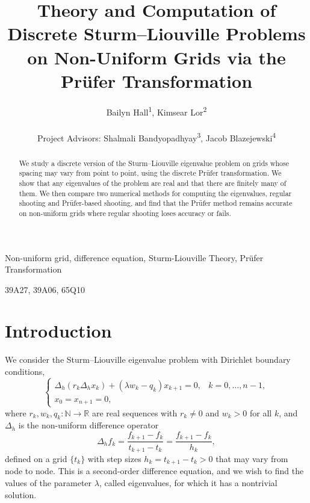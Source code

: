 \documentclass[12pt,reqno]{amsart}
\title[Non-Uniform Discrete Pr\"ufer]{Theory and Computation of Discrete Sturm--Liouville Problems on Non-Uniform Grids via the Pr\"ufer Transformation}
\author{Bailyn Hall\textsuperscript{1}, Kimsear Lor\textsuperscript{2}\\ \\ Project Advisors: Shalmali Bandyopadhyay\textsuperscript{3}, Jacob Blazejewski\textsuperscript{4}}
\newcommand{\R}{\mathbb{R}}
\newcommand{\N}{\mathbb{N}}
\numberwithin{equation}{section}
\begin{document}
\begin{abstract}
We study a discrete version of the Sturm--Liouville eigenvalue problem on grids whose spacing may vary from point to point, using the discrete Pr\"ufer transformation. We show that any eigenvalues of the problem are real and that there are finitely many of them. We then compare two numerical methods for computing the eigenvalues, regular shooting and Pr\"ufer-based shooting, and find that the Pr\"ufer method remains accurate on non-uniform grids where regular shooting loses accuracy or fails.
\end{abstract}

\maketitle
{}
\pagestyle{headings}
 Non-uniform grid, difference equation, Sturm-Liouville Theory, Pr\"ufer Transformation

\smallskip

 39A27, 39A06, 65Q10


\section{Introduction}
\label{sec:intro}

We consider the Sturm--Liouville eigenvalue problem with Dirichlet boundary conditions,
\begin{equation} \label{eq:main}
\begin{cases}
\Delta_h\!\left(r_k\Delta_h x_k\right) + \left(\lambda w_k - q_k\right) x_{k+1} = 0, & k = 0, \ldots, n-1, \\
x_0 = x_{n+1} = 0,
\end{cases}
\end{equation}
where \(r_k, w_k, q_k : \N \to \R\) are real sequences with \(r_k \neq 0\) and \(w_k > 0\) for all \(k\), and \(\Delta_h\) is the non-uniform difference operator
\begin{equation}
\label{def:2.2}
\Delta_h f_k = \frac{f_{k+1} - f_k}{t_{k+1} - t_k} = \frac{f_{k+1} - f_k}{h_k},    
\end{equation}
defined on a grid \(\{t_k\}\) with step sizes \(h_k = t_{k+1} - t_k > 0\) that may vary from node to node. This is a second-order difference equation, and we wish to find the values of the parameter \(\lambda\), called eigenvalues, for which it has a nontrivial solution.
\end{document}
